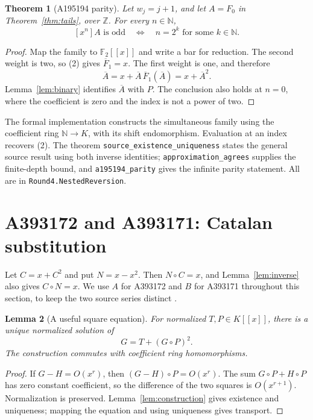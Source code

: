 \documentclass[11pt,a4paper]{article}
\newtheorem{theorem}{Theorem}[section]
\newtheorem{lemma}[theorem]{Lemma}
\theoremstyle{remark}
\newcommand{\Z}{\mathbb Z}
\newcommand{\N}{\mathbb N}
\newcommand{\F}{\mathbb F}
\begin{document}
\begin{theorem}[A195194 parity]\label{thm:nestedparity}
Let $w_j=j+1$, and let $A=F_0$ in Theorem~\ref{thm:tails}, over $\Z$.
For every $n\in\N$,
\[
 [x^n]A\text{ is odd}\quad\Longleftrightarrow\quad
 n=2^k\text{ for some }k\in\N.
\]
\end{theorem}

\begin{proof}
Map the family to $\F_2[[x]]$ and write a bar for reduction. The second
weight is two, so (2) gives $\overline F_1=x$. The first weight is one,
and therefore
\[
 \overline A=x+\overline A\,\overline F_1(\overline A)
             =x+\overline A^2.
\]
Lemma~\ref{lem:binary} identifies $\overline A$ with $P$. The conclusion
also holds at $n=0$, where the coefficient is zero and the index is not a
power of two.
\end{proof}

The formal implementation constructs the simultaneous family using the
coefficient ring $\N\to K$, with its shift endomorphism. Evaluation at an
index recovers (2). The theorem \texttt{source\_existence\_uniqueness}
states the general source result using both inverse identities;
\texttt{approximation\_agrees} supplies the finite-depth bound, and
\texttt{a195194\_parity} gives the infinite parity statement. All are in
\texttt{Round4.NestedReversion}.

\section{A393172 and A393171: Catalan substitution}

Let $C=x+C^2$ and put $N=x-x^2$. Then $N\circ C=x$, and
Lemma~\ref{lem:inverse} also gives $C\circ N=x$. We use $A$ for A393172
and $B$ for A393171 throughout this section, to keep the two source
series distinct \cite{oeis172,oeis171}.

\begin{lemma}[A useful square equation]\label{lem:square}
For normalized $T,P\in K[[x]]$, there is a unique normalized solution of
\[
 G=T+(G\circ P)^2.
\]
The construction commutes with coefficient ring homomorphisms.
\end{lemma}

\begin{proof}
If $G-H=O(x^r)$, then $(G-H)\circ P=O(x^r)$. The sum
$G\circ P+H\circ P$ has zero constant coefficient, so the difference
of the two squares is $O(x^{r+1})$. Normalization is preserved.
Lemma~\ref{lem:construction} gives existence and uniqueness; mapping the
equation and using uniqueness gives transport.
\end{proof}
\end{document}
